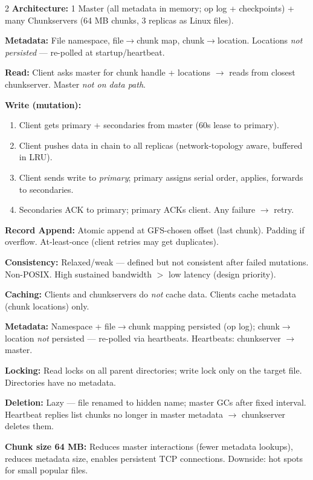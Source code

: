 \documentclass[9pt]{article}
\begin{document}
\begin{multicols*}{2}
\textbf{Architecture:} 1 Master (all metadata in memory; op log + checkpoints) + many Chunkservers (64 MB chunks, 3 replicas as Linux files).

\textbf{Metadata:} File namespace, file$\to$chunk map, chunk$\to$location. Locations \emph{not persisted} — re-polled at startup/heartbeat.

\textbf{Read:} Client asks master for chunk handle + locations $\to$ reads from closest chunkserver. Master \emph{not on data path}.

\textbf{Write (mutation):}
\begin{enumerate}
  \item Client gets primary + secondaries from master (60s lease to primary).
  \item Client pushes data in chain to all replicas (network-topology aware, buffered in LRU).
  \item Client sends write to \emph{primary}; primary assigns serial order, applies, forwards to secondaries.
  \item Secondaries ACK to primary; primary ACKs client. Any failure $\to$ retry.
\end{enumerate}

\textbf{Record Append:} Atomic append at GFS-chosen offset (last chunk). Padding if overflow. At-least-once (client retries may get duplicates).

\textbf{Consistency:} Relaxed/weak — defined but not consistent after failed mutations. Non-POSIX. High sustained bandwidth $>$ low latency (design priority).

\textbf{Caching:} Clients and chunkservers do \emph{not} cache data. Clients cache metadata (chunk locations) only.

\textbf{Metadata:} Namespace + file$\to$chunk mapping persisted (op log); chunk$\to$location \emph{not} persisted — re-polled via heartbeats. Heartbeats: chunkserver $\to$ master.

\textbf{Locking:} Read locks on all parent directories; write lock only on the target file. Directories have no metadata.

\textbf{Deletion:} Lazy — file renamed to hidden name; master GCs after fixed interval. Heartbeat replies list chunks no longer in master metadata $\to$ chunkserver deletes them.

\textbf{Chunk size 64 MB:} Reduces master interactions (fewer metadata lookups), reduces metadata size, enables persistent TCP connections. Downside: hot spots for small popular files.


\end{multicols*}
\end{document}
